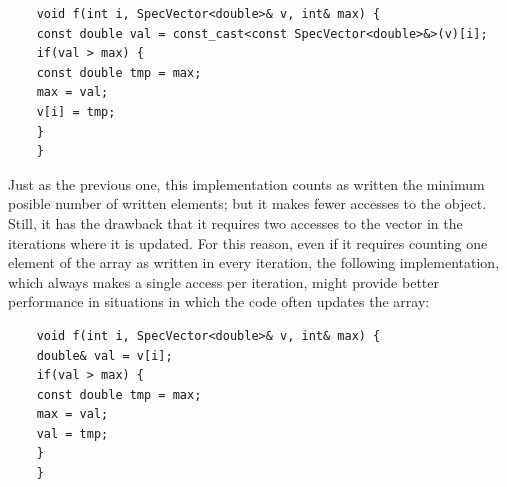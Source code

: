 \documentclass[11pt,a4paper]{article}
\begin{document}
	\begin{verbatim}
	void f(int i, SpecVector<double>& v, int& max) {
	const double val = const_cast<const SpecVector<double>&>(v)[i]; 
	if(val > max) {
	const double tmp = max;
	max = val;
	v[i] = tmp;
	}
	}
	\end{verbatim}
	
	Just as the previous one, this implementation counts as written the minimum posible number of written elements; but it makes fewer accesses to the object. Still, it has the drawback that it requires two accesses to the vector in the iterations where it is updated. For this reason, even if it requires counting one element of the array as written in every iteration, the following implementation, which always makes a single access per iteration, might provide better performance in situations in which the code often updates the array:
	
	\begin{verbatim}
	void f(int i, SpecVector<double>& v, int& max) {
	double& val = v[i];
	if(val > max) {
	const double tmp = max;
	max = val;
	val = tmp;
	}
	}
	\end{verbatim}
	
\end{document}
